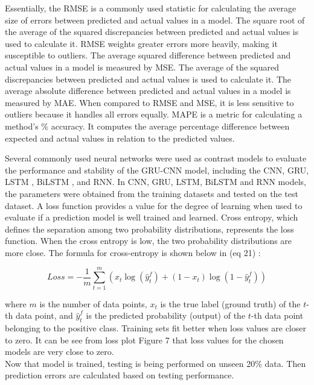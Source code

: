 Essentially, the RMSE is a commonly used statistic for calculating the average size of errors between predicted and actual values in a model. The square root of the average of the squared discrepancies between predicted and actual values is used to calculate it. RMSE weights greater errors more heavily,  making it susceptible to outliers. The average squared difference between predicted and actual values in a model is measured by MSE. The average of the squared discrepancies between predicted and actual values is used to calculate it. The average absolute difference between predicted and actual values in a model is measured by MAE. When compared to RMSE and MSE,  it is less sensitive to outliers because it handles all errors equally. MAPE is a metric for calculating a method's \% accuracy. It computes the average percentage difference between expected and actual values in relation to the predicted values. 








Several commonly used neural networks were used as contrast models to evaluate the performance and stability of the GRU-CNN model,  including the CNN,  GRU,  LSTM ,  BiLSTM ,  and RNN. In CNN,  GRU,  LSTM,  BiLSTM and RNN models,  the parameters were obtained from the training datasets and tested on the test dataset. A loss function provides a value for the degree of learning when used to evaluate if a prediction model is well trained and learned. Cross entropy,  which defines the separation among two probability distributions,  represents the loss function.
When the cross entropy is low,  the two probability distributions are more close. The formula for cross-entropy is shown below in (eq 21) :

\begin{equation}
  {Loss} =- \frac{1}{m} \sum_{t=1}^{m} \left( x_t \log(\hat{y}_{t}^f) + (1 - x_t) \log(1 - \hat{y}_{t}^f) \right)
\end{equation}

where $m$ is the number of data points,  $x_t$ is the true label (ground truth) of the $t$-th data point,  and $\hat{y}_{t}^f$ is the predicted probability (output) of the $t$-th data point belonging to the positive class.
Training sets fit better when loss values are closer to zero.
It can be see from loss plot Figure 7 that loss values for the chosen models are very close to zero. \\ Now that model is trained,  testing is being performed on unseen 20\% data. Then prediction errors are calculated based on testing performance.

